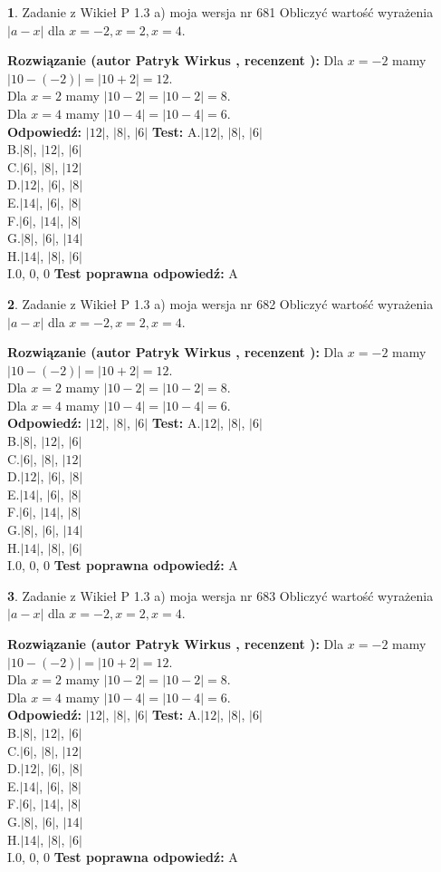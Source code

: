 \documentclass[12pt, a4paper]{article}
\theoremstyle{definition} %
\newtheorem{zad}{}
\newcommand{\zadStart}[1]{\begin{zad}#1\newline}
\newcommand{\zadStop}{\end{zad}}
\newcommand{\rozwStart}[2]{\noindent \textbf{Rozwiązanie (autor #1 , recenzent #2): }\newline}
\newcommand{\rozwStop}{\newline}
\newcommand{\odpStart}{\noindent \textbf{Odpowiedź:}\newline}
\newcommand{\odpStop}{\newline}
\newcommand{\testStart}{\noindent \textbf{Test:}\newline}
\newcommand{\testStop}{\newline}
\newcommand{\kluczStart}{\noindent \textbf{Test poprawna odpowiedź:}\newline}
\newcommand{\kluczStop}{\newline}
\begin{document}
\zadStart{Zadanie z Wikieł P 1.3 a) moja wersja nr 681}
Obliczyć wartość wyrażenia $|a - x|$ dla $x=-2,x=2,x=4$.
\zadStop
\rozwStart{Patryk Wirkus}{}
Dla $x = -2$ mamy $|10 - (-2)| = |10 + 2| = 12$.\\
Dla $x = 2$ mamy $|10 - 2| = |10 - 2| = 8$.\\
Dla $x = 4$ mamy $|10 - 4| = |10 - 4| = 6$.\\
\rozwStop
\odpStart
$|12|$, $|8|$, $|6|$
\odpStop
\testStart
A.$|12|$, $|8|$, $|6|$\\
B.$|8|$, $|12|$, $|6|$\\
C.$|6|$, $|8|$, $|12|$\\
D.$|12|$, $|6|$, $|8|$\\
E.$|14|$, $|6|$, $|8|$\\
F.$|6|$, $|14|$, $|8|$\\
G.$|8|$, $|6|$, $|14|$\\
H.$|14|$, $|8|$, $|6|$\\
I.$0$, $0$, $0$
\testStop
\kluczStart
A
\kluczStop



\zadStart{Zadanie z Wikieł P 1.3 a) moja wersja nr 682}
Obliczyć wartość wyrażenia $|a - x|$ dla $x=-2,x=2,x=4$.
\zadStop
\rozwStart{Patryk Wirkus}{}
Dla $x = -2$ mamy $|10 - (-2)| = |10 + 2| = 12$.\\
Dla $x = 2$ mamy $|10 - 2| = |10 - 2| = 8$.\\
Dla $x = 4$ mamy $|10 - 4| = |10 - 4| = 6$.\\
\rozwStop
\odpStart
$|12|$, $|8|$, $|6|$
\odpStop
\testStart
A.$|12|$, $|8|$, $|6|$\\
B.$|8|$, $|12|$, $|6|$\\
C.$|6|$, $|8|$, $|12|$\\
D.$|12|$, $|6|$, $|8|$\\
E.$|14|$, $|6|$, $|8|$\\
F.$|6|$, $|14|$, $|8|$\\
G.$|8|$, $|6|$, $|14|$\\
H.$|14|$, $|8|$, $|6|$\\
I.$0$, $0$, $0$
\testStop
\kluczStart
A
\kluczStop



\zadStart{Zadanie z Wikieł P 1.3 a) moja wersja nr 683}
Obliczyć wartość wyrażenia $|a - x|$ dla $x=-2,x=2,x=4$.
\zadStop
\rozwStart{Patryk Wirkus}{}
Dla $x = -2$ mamy $|10 - (-2)| = |10 + 2| = 12$.\\
Dla $x = 2$ mamy $|10 - 2| = |10 - 2| = 8$.\\
Dla $x = 4$ mamy $|10 - 4| = |10 - 4| = 6$.\\
\rozwStop
\odpStart
$|12|$, $|8|$, $|6|$
\odpStop
\testStart
A.$|12|$, $|8|$, $|6|$\\
B.$|8|$, $|12|$, $|6|$\\
C.$|6|$, $|8|$, $|12|$\\
D.$|12|$, $|6|$, $|8|$\\
E.$|14|$, $|6|$, $|8|$\\
F.$|6|$, $|14|$, $|8|$\\
G.$|8|$, $|6|$, $|14|$\\
H.$|14|$, $|8|$, $|6|$\\
I.$0$, $0$, $0$
\testStop
\kluczStart
A
\kluczStop
\end{document}
